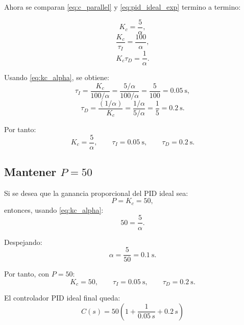 \documentclass[11pt]{article}
\begin{document}
Ahora se comparan \eqref{eq:c_parallel} y \eqref{eq:pid_ideal_exp} termino a termino:

\begin{equation}
K_c=\frac{5}{\alpha},
\label{eq:kc_alpha}
\end{equation}
\begin{equation}
\frac{K_c}{\tau_I}=\frac{100}{\alpha},
\end{equation}
\begin{equation}
K_c\tau_D=\frac{1}{\alpha}.
\end{equation}

Usando \eqref{eq:kc_alpha}, se obtiene:
\begin{equation}
\tau_I=\frac{K_c}{100/\alpha}
=
\frac{5/\alpha}{100/\alpha}
=
\frac{5}{100}
=
0.05\ \text{s},
\end{equation}
\begin{equation}
\tau_D=\frac{(1/\alpha)}{K_c}
=
\frac{1/\alpha}{5/\alpha}
=
\frac{1}{5}
=
0.2\ \text{s}.
\end{equation}

Por tanto:
\begin{equation}
K_c=\frac{5}{\alpha},\qquad
\tau_I=0.05\ \text{s},\qquad
\tau_D=0.2\ \text{s}.
\label{eq:pid_params_general}
\end{equation}

\subsection{Mantener $P=50$}

Si se desea que la ganancia proporcional del PID ideal sea:
\[
P=K_c=50,
\]
entonces, usando \eqref{eq:kc_alpha}:
\begin{equation}
50=\frac{5}{\alpha}.
\end{equation}

Despejando:
\begin{equation}
\alpha=\frac{5}{50}=0.1\ \text{s}.
\end{equation}

Por tanto, con $P=50$:
\begin{equation}
K_c=50,\qquad
\tau_I=0.05\ \text{s},\qquad
\tau_D=0.2\ \text{s}.
\label{eq:pid_final}
\end{equation}

El controlador PID ideal final queda:
\begin{equation}
\boxed{
C(s)=50\left(1+\frac{1}{0.05\,s}+0.2\,s\right)
}
\label{eq:pid_ideal_final}
\end{equation}
\end{document}
